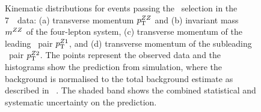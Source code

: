 \begin{figure}[htbp]
    \begin{center}
    \caption[Kinematic distributions for events passing the \ZZ\ selection in
    the 7~\tev\ data.]
    {Kinematic distributions for events passing the \ZZ\ selection in
    the 7~\tev\ data: (a) transverse momentum $p_{\mathrm{T}}^{ZZ}$ and (b) invariant mass $m^{ZZ}$ of the 
    four-lepton system, (c) transverse momentum of the leading
    \dilep\ pair $p_{\mathrm{T}}^{Z1}$, and (d) transverse momentum of the subleading
    \dilep\ pair $p_{\mathrm{T}}^{Z2}$. The points represent the observed data and the 
    histograms show the prediction from simulation, where the background
    is normalised to the total background estimate as described in
    ~. The shaded band 
    shows the combined statistical and systematic uncertainty on the prediction. 
    }
    \label{fig:zzdists-ZZ-seven}
    \end{center}
\end{figure}


